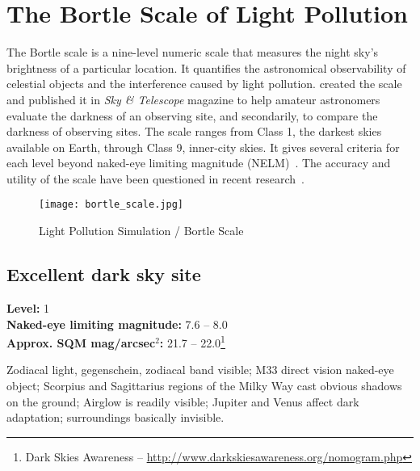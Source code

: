 
\chapter{The Bortle Scale of Light Pollution}
\label{ch:BortleScale}

The Bortle scale is a nine-level numeric scale that 
measures the night sky's brightness of a particular 
location. It quantifies the astronomical observability 
of celestial objects and the interference caused by 
light pollution.  created the 
scale and published it in \emph{Sky \& Telescope} 
magazine to help amateur astronomers evaluate the 
darkness of an observing site, and secondarily, 
to compare the darkness of observing sites. The 
scale ranges from Class 1, the darkest skies available 
on Earth, through Class 9, inner-city skies. 
It gives several criteria for each level beyond 
naked-eye limiting magnitude (NELM)~\cite{Bortle}. 
The accuracy and utility of the scale have been questioned in 
recent research~\cite{2014MNRAS.442.2600C}.

\begin{figure}[ht]\centering
\texttt{[image: bortle\_scale.jpg]}
\caption{Light Pollution Simulation / Bortle Scale}
\label{fig:BortleScale}
\end{figure}

\section{Excellent dark sky site}
\textbf{Level:} 1 \\
\textbf{Naked-eye limiting magnitude:} 7.6 -- 8.0 \\
\textbf{Approx. SQM mag/arcsec$^2$:} 21.7 -- 22.0\footnote{Dark Skies Awareness -- \url{http://www.darkskiesawareness.org/nomogram.php}}

Zodiacal light, gegenschein, zodiacal band visible; M33 direct vision
naked-eye object; Scorpius and Sagittarius regions of the Milky Way
cast obvious shadows on the ground; Airglow is readily visible;
Jupiter and Venus affect dark adaptation; surroundings basically
invisible.

